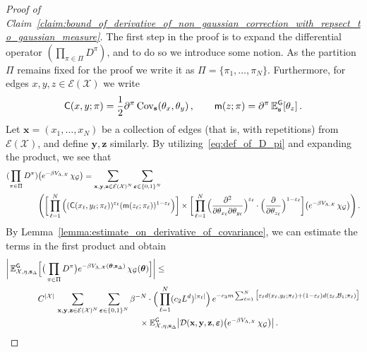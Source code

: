 \documentclass[11pt]{article}
\theoremstyle{definition}
\theoremstyle{remark}
\numberwithin{theorem}{section}
\def\eps{{\varepsilon}}
\def\La{{\Lambda}}
\newcommand{\bE}{\mathbb E}
\newcommand{\cE}{\mathcal{E}}
\newcommand{\Cov}{\operatorname{Cov}}
\begin{document}
    \begin{proof}[Proof of Claim~\ref{claim:bound_of_derivative_of_non_gaussian_correction_with_repsect_to_gaussian_measure}]
        The first step in the proof is to expand the differential operator $(\prod_{\pi\in \Pi} D^\pi)$, and to do so we introduce some notion. As the partition $\Pi$ remains fixed for the proof we write it as $\Pi = \{\pi_1,\ldots,\pi_N\}$. Furthermore, for edges $x,y,z\in \cE(\mathcal{X})$ we write 
        \[
        {\sf C}(x,y;\pi) = \frac{1}{2} \partial^\pi \Cov_{\mathbf{s}} (\theta_x,\theta_y)  \, , \qquad  {\sf m}(z;\pi) = \partial^\pi \, \bE_{\mathbf{s}}^{\sf G}[\theta_z] \, .
        \]
        Let $\mathbf{x} = (x_1,\ldots,x_N) $ be a collection of edges (that is, with repetitions) from $\cE(\mathcal{X})$, and define $\mathbf{y}, \mathbf{z}$ similarly. 
        By utilizing~\eqref{eq:def_of_D_pi} and expanding the product, we see that 
        \begin{align} \label{eq:expanding_D_pi_general_partition}
            (\prod_{\pi\in \Pi} D^\pi) &\big(e^{-\beta V_{\La,\mathcal{X}}} \, \chi_{\mathcal{G}} \big)  = \sum_{\mathbf{x},\mathbf{y},\mathbf{z} \in \cE(\mathcal{X})^N} \sum_{\boldsymbol{\eps} \in \{0,1\}^N} \\ & \nonumber \Bigg(\bigg[\prod_{\ell=1}^{N} \Big( ({\sf C}(x_\ell,y_\ell;\pi_\ell) )^{\eps_\ell} ({\sf m}(z_\ell;\pi_\ell))^{1-\eps_\ell} \Big) \bigg]\times\bigg[\prod_{\ell=1}^{N} \Big(\frac{\partial^2}{\partial \theta_{x_\ell}\partial \theta_{y_\ell}} \Big)^{\eps_\ell} \cdot \Big(\frac{\partial}{\partial \theta_{ z_{\ell}}}\Big)^{1-\eps_\ell}\bigg] \big(e^{-\beta V_{\La,\mathcal{X}}} \, \chi_{\mathcal{G}} \big) \Bigg) \, .
        \end{align}
        By Lemma~\ref{lemma:estimate_on_derivative_of_covariance}, we can estimate the terms in the first product and obtain
        \begin{align} \label{eq:expanding_D_pi_general_partition_after_estimate_on_covariance}
            \bigg| \,  \bE_{\mathcal{X},\eta,\mathbf{s}_{\Delta}}^{\sf G} &\Big[ \big( \prod_{\pi\in \Pi} D^\pi\big)  e^{-\beta V_{\La,\mathcal{X}} (\boldsymbol{\theta}; \mathbf{s}_{\Delta})}  \, \chi_{\mathcal{G}} (\boldsymbol{\theta})  \Big] \bigg| \le \\ \nonumber  & C^{|\mathcal{X}|} \,  \sum_{\mathbf{x},\mathbf{y},\mathbf{z} \in \cE(\mathcal{X})^N} \sum_{\boldsymbol{\eps} \in \{0,1\}^N} \beta^{-N} \cdot \Big(\prod_{\ell=1}^{N} (c_2 L^d)^{|\pi_\ell|}\Big) \,  e^{-c_3 m \sum_{\ell=1}^{N} \big[\eps_\ell d(x_\ell,y_\ell;\pi_\ell) + (1-\eps_\ell) d(z_\ell, \mathcal{B}_1 ; \pi_\ell)\big] } \\ \nonumber & \qquad \qquad \qquad \qquad \qquad \qquad \times \bE_{\mathcal{X},\eta,\mathbf{s}_{\Delta}}^{\sf G} \big|\mathcal{D}(\mathbf{x},\mathbf{y},\mathbf{z}, \boldsymbol{\eps} ) \big(e^{-\beta V_{\La,\mathcal{X}}} \, \chi_{\mathcal{G}} \big)\big|  \, .

\end{align}
\end{proof}
\end{document}

